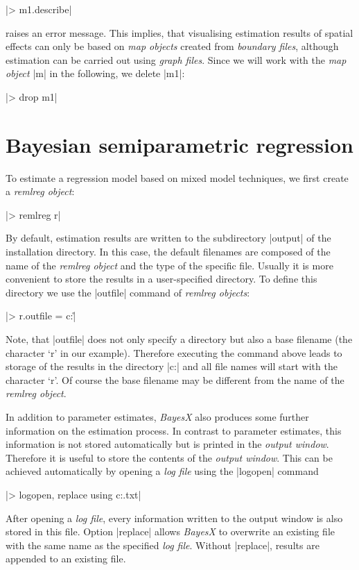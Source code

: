 |> m1.describe|

raises an error message. This implies, that visualising estimation results of spatial effects can only be based on {\it map
objects} created from {\it boundary files}, although estimation can be carried out using {\it graph files}. Since we will work
with the {\it map object} |m| in the following, we delete |m1|:

|> drop m1|

\section{Bayesian semiparametric regression}\label{reml:regression}

To estimate a regression model based on mixed model techniques, we first create a {\it remlreg object}:

|> remlreg r|

By default, estimation results are written to the subdirectory |output| of the installation directory. In this case, the
default filenames are composed of the name of the {\it remlreg object} and the type of the specific file. Usually it is more
convenient to store the results in a user-specified directory. To define this directory we use the |outfile| command of {\it
remlreg objects}:

|> r.outfile = c:\data\r|

Note, that |outfile| does not only specify a directory but also a base filename (the character `r' in our example). Therefore
executing the command above leads to storage of the results in the directory |c:\data| and all file names will start with the
character `r'. Of course the base filename may be different from the name of the {\it remlreg object}.

In addition to parameter estimates, {\it BayesX} also produces some further information on the estimation process. In contrast
to parameter estimates, this information is not stored automatically but is printed in the {\it output window}. Therefore it is
useful to store the contents of the {\it output window}. This can be achieved automatically by opening a {\it log file} using
the |logopen| command

|> logopen, replace using c:\data\logreml.txt|

After opening a {\it log file}, every information written to the output window is also stored in this file. Option |replace|
allows {\it BayesX} to overwrite an existing file with the same name as the specified {\it log file}. Without |replace|,
results are appended to an existing file.

